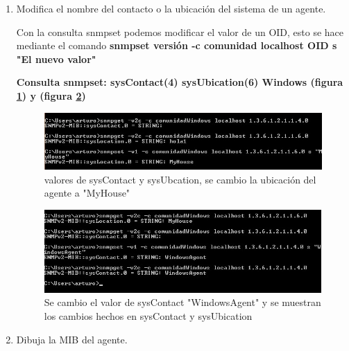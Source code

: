 \begin{enumerate}
\item Modifica el nombre del contacto o la ubicación del sistema de un agente.

Con la consulta snmpset podemos modificar el valor de un OID, esto se hace mediante el comando \textbf{snmpset versión -c comunidad localhost OID s "El nuevo valor"}

\textbf{Consulta snmpset: sysContact(4) sysUbication(6) Windows (figura \ref{image:131}) y (figura \ref{image:132})}
\FloatBarrier
\begin{figure}[htbp!]
		\centering
	\includegraphics[width=.9 \textwidth]{images/131}
		\caption{valores de sysContact y sysUbcation, se cambio la ubicación del agente a "MyHouse"}		\label{image:131}
\end{figure}
\begin{figure}[htbp!]
		\centering
	\includegraphics[width=.9 \textwidth]{images/132}
		\caption{Se cambio el valor de sysContact "WindowsAgent" y se muestran los cambios hechos en sysContact y sysUbication}		\label{image:132}
\end{figure}
\FloatBarrier


\item Dibuja la MIB del agente.
\end{enumerate}